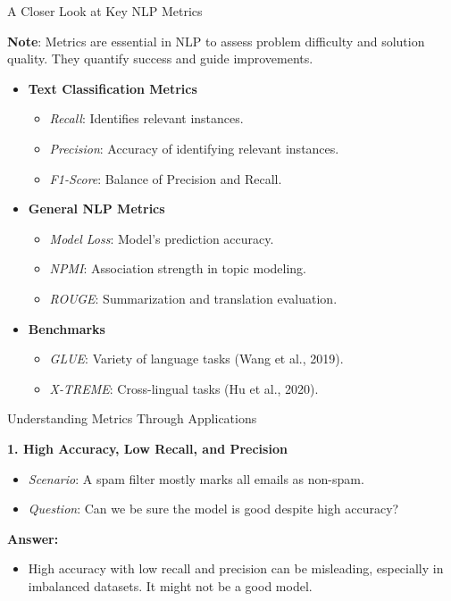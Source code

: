 \documentclass{beamer}
\newenvironment{stepitemize}{\begin{itemize}[<+->]}{\end{itemize} }
\begin{document}
\begin{frame}{A Closer Look at Key NLP Metrics}

\textbf{Note}: Metrics are essential in NLP to assess problem difficulty and solution quality. They quantify success and guide improvements.

\begin{stepitemize}
  \item \textbf{Text Classification Metrics}
    \begin{itemize}
      \item \textit{Recall}: Identifies relevant instances.
      \item \textit{Precision}: Accuracy of identifying relevant instances.
      \item \textit{F1-Score}: Balance of Precision and Recall.
    \end{itemize}

  \item \textbf{General NLP Metrics}
    \begin{itemize}
      \item \textit{Model Loss}: Model's prediction accuracy.
      \item \textit{NPMI}: Association strength in topic modeling.
      \item \textit{ROUGE}: Summarization and translation evaluation.
    \end{itemize}

  \item \textbf{Benchmarks}
    \begin{itemize}
      \item \textit{GLUE}: Variety of language tasks (Wang et al., 2019).
      \item \textit{X-TREME}: Cross-lingual tasks (Hu et al., 2020).
    \end{itemize}
\end{stepitemize}

\end{frame}

\begin{frame}{Understanding Metrics Through Applications}

\textbf{1. High Accuracy, Low Recall, and Precision}
\begin{itemize}
  \item \textit{Scenario}: A spam filter mostly marks all emails as non-spam.
  \item \textit{Question}: Can we be sure the model is good despite high accuracy?
\end{itemize}
\pause

\textbf{Answer:}
\begin{itemize}
  \item High accuracy with low recall and precision can be misleading, especially in imbalanced datasets. It might not be a good model.
\end{itemize}
\end{frame}
\end{document}
